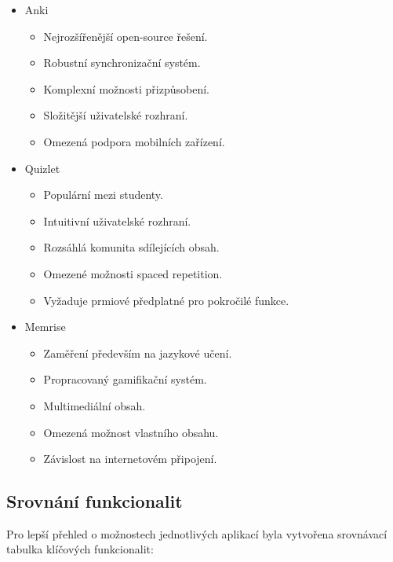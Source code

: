 \documentclass[12pt, a4paper, twoside, openright]{report}
\begin{document}
	\begin{itemize}
		\item Anki
		\begin{itemize}
			\item Nejrozšířenější open-source řešení.
			\item Robustní synchronizační systém.
			\item Komplexní možnosti přizpůsobení.
			\item Složitější uživatelské rozhraní.
			\item Omezená podpora mobilních zařízení.
		\end{itemize}

		\item Quizlet
		\begin{itemize}
			\item Populární mezi studenty.
			\item Intuitivní uživatelské rozhraní.
			\item Rozsáhlá komunita sdílejících obsah.
			\item Omezené možnosti spaced repetition.
			\item Vyžaduje prmiové předplatné pro pokročilé funkce.
		\end{itemize}

		\item Memrise
		\begin{itemize}
			\item Zaměření především na jazykové učení.
			\item Propracovaný gamifikační systém.
			\item Multimediální obsah.
			\item Omezená možnost vlastního obsahu.
			\item Závislost na internetovém připojení.
		\end{itemize}
	\end{itemize}

	\subsection{Srovnání funkcionalit}
	Pro lepší přehled o možnostech jednotlivých aplikací byla vytvořena srovnávací tabulka klíčových funkcionalit:
\end{document}
